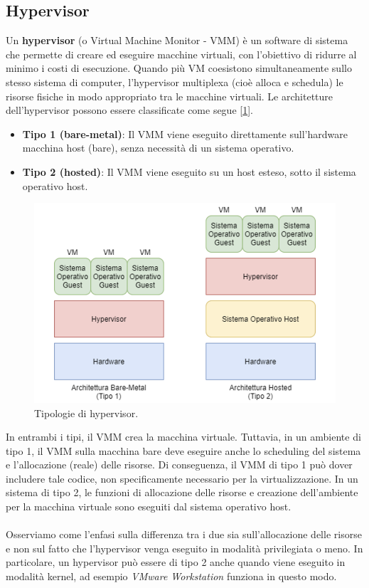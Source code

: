 \subsection{Hypervisor}
Un \textbf{hypervisor} (o Virtual Machine Monitor - VMM) è un software di sistema che permette di creare ed eseguire macchine virtuali, con l'obiettivo di ridurre al minimo i costi di esecuzione. Quando più VM coesistono simultaneamente sullo stesso sistema di computer, l’hypervisor multiplexa (cioè alloca e
schedula) le risorse fisiche in modo appropriato tra le macchine virtuali. Le architetture dell’hypervisor possono essere classificate come segue [\ref{fig:hyper-type}].
\begin{itemize}
    \item \textbf{Tipo 1 (bare-metal)}: Il VMM viene eseguito direttamente sull'hardware macchina host (bare), senza necessità di un sistema operativo.
    \item \textbf{Tipo 2 (hosted)}: Il VMM viene eseguito su un host esteso, sotto il sistema operativo host.
\end{itemize}
\begin{figure}[!h]
    \centering
    \includegraphics[width=0.6\linewidth]{img/hyperv-types.png}
    \caption{Tipologie di hypervisor.}
    \label{fig:hyper-type}
\end{figure}
In entrambi i tipi, il VMM crea la macchina virtuale. Tuttavia, in un ambiente di tipo 1, il
VMM sulla macchina bare deve eseguire anche lo scheduling del sistema e l'allocazione (reale)
delle risorse. Di conseguenza, il VMM di tipo 1 può dover includere tale codice, non specificamente
necessario per la virtualizzazione. In un sistema di tipo 2, le funzioni di allocazione delle
risorse e creazione dell'ambiente per la macchina virtuale sono eseguiti dal sistema operativo host.
\\
\\
Osserviamo come l'enfasi sulla differenza tra i due sia sull'allocazione delle risorse e non sul fatto che l’hypervisor venga eseguito in modalità privilegiata o meno. In particolare, un hypervisor può essere di tipo 2 anche quando viene eseguito in modalità kernel, ad esempio \textit{VMware Workstation} funziona in questo modo.
